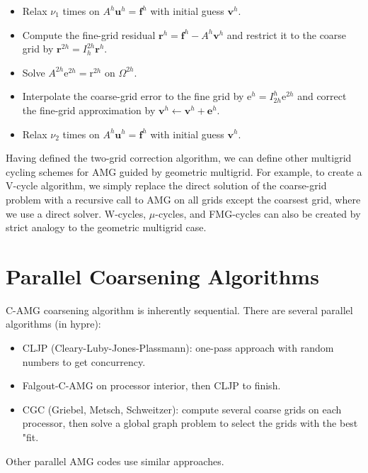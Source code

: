 \documentclass[11pt]{book}
\begin{document}
\begin{itemize}
  \item Relax $\nu_{1}$ times on $A^{h} \mathbf{u}^{h}=\mathbf{f}^{h}$ with initial guess $\mathbf{v}^{h}$.

  \item Compute the fine-grid residual $\mathbf{r}^{h}=\mathbf{f}^{h}-A^{h} \mathbf{v}^{h}$ and restrict it to the coarse grid by $\mathbf{r}^{2 h}=I_{h}^{2 h} \mathbf{r}^{h}$.

  \item Solve $A^{2 h} \mathrm{e}^{2 h}=\mathrm{r}^{2 h}$ on $\Omega^{2 h}$.

  \item Interpolate the coarse-grid error to the fine grid by $\mathrm{e}^{h}=I_{2 h}^{h} \mathrm{e}^{2 h}$ and correct the fine-grid approximation by $\mathbf{v}^{h} \leftarrow \mathbf{v}^{h}+\mathbf{e}^{h}$.

  \item Relax $\nu_{2}$ times on $A^{h} \mathbf{u}^{h}=\mathbf{f}^{h}$ with initial guess $\mathbf{v}^{h}$.

\end{itemize}
Having defined the two-grid correction algorithm, we can define other multigrid cycling schemes for AMG guided by geometric multigrid. For example, to create a V-cycle algorithm, we simply replace the direct solution of the coarse-grid problem with a recursive call to AMG on all grids except the coarsest grid, where we use a direct solver. W-cycles, $\mu$-cycles, and FMG-cycles can also be created by strict analogy to the geometric multigrid case.

\section*{Parallel Coarsening Algorithms}
C-AMG coarsening algorithm is inherently sequential. There are several parallel algorithms (in hypre):

\begin{itemize}
  \item CLJP (Cleary-Luby-Jones-Plassmann): one-pass approach with random numbers to get concurrency.
  \item Falgout-C-AMG on processor interior, then CLJP to finish.
  \item CGC (Griebel, Metsch, Schweitzer): compute several coarse grids on each processor, then solve a global graph problem to select the grids with the best "fit.
\end{itemize}
Other parallel AMG codes use similar approaches.
\end{document}
